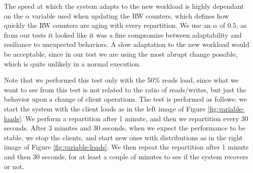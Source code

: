 The speed at which the system adapts to the new workload is highly dependant on the $\alpha$ variable used when updating the RW counters, which defines how quickly the RW counters are aging with every repartition. We use an $\alpha$ of $0.5$, as from our tests it looked like it was a fine compromise between adaptability and resiliance to unexpected behaviors. A slow adaptation to the new workload would be acceptable, since in our test we are using the most abrupt change possible, which is quite unlikely in a normal execution.

Note that we performed this test only with the 50\% reads load, since what we want to see from this test is not related to the ratio of reads/writes, but just the behavior upon a change of client operations. The test is performed as follows: we start the system with the client loads as in the left image of Figure \ref{fig:variable-loads}. We perform a repartition after 1 minute, and then we repartition every 30 seconds. After 3 minutes and 30 seconds, when we expect the performance to be stable, we stop the clients, and start new ones with distributions as in the right image of Figure \ref{fig:variable-loads}. We then repeat the repartition after 1 minute and then 30 seconds, for at least a couple of minutes to see if the system recovers or not. 

